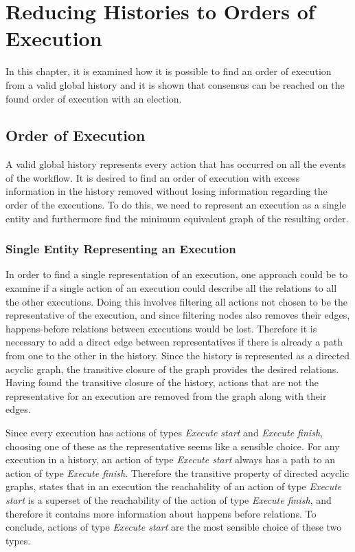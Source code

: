 \chapter{Reducing Histories to Orders of Execution}\label{chap:order-of-execution}
	In this chapter, it is examined how it is possible to find an order of execution from a valid global history and it is shown that consensus can be reached on the found order of execution with an election.

\section{Order of Execution}
	A valid global history represents every action that has occurred on all the events of the workflow.
	It is desired to find an order of execution with excess information in the history removed without losing information regarding the order of the executions. To do this, we need to represent an execution as a single entity and furthermore find the minimum equivalent graph of the resulting order.
	
	\subsection{Single Entity Representing an Execution}
	In order to find a single representation of an execution, one approach could be to examine if a single action of an execution could describe all the relations to all the other executions. Doing this involves filtering all actions not chosen to be the representative of the execution, and since filtering nodes also removes their edges, happens-before relations between executions would be lost. Therefore it is necessary to add a direct edge between representatives if there is already a path from one to the other in the history. Since the history is represented as a directed acyclic graph, the transitive closure of the graph provides the desired relations. Having found the transitive closure of the history, actions that are not the representative for an execution are removed from the graph along with their edges.
	
	Since every execution has actions of types \textit{Execute start} and \textit{Execute finish}, choosing one of these as the representative seems like a sensible choice. For any execution in a history, an action of type \textit{Execute start} always has a path to an action of type \textit{Execute finish}. Therefore the transitive property of directed acyclic graphs, states that in an execution the reachability of an action of type \textit{Execute start} is a superset of the reachability of the action of type \textit{Execute finish}, and therefore it contains more information about happens before relations. To conclude, actions of type \textit{Execute start} are the most sensible choice of these two types.
	
